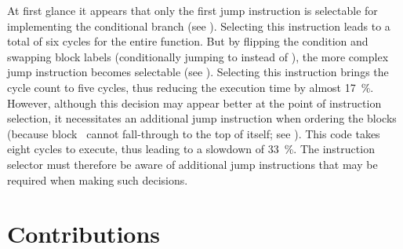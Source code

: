 At first glance it appears that only the first jump \gls{instruction} is
selectable for implementing the conditional branch (see
).
%
Selecting this \gls{instruction} leads to a total of six cycles for the entire
\gls{function}.
%
But by flipping the condition and swapping block labels (conditionally jumping
to  instead of ), the more complex jump
\gls{instruction} becomes selectable (see
).
%
Selecting this \gls{instruction} brings the cycle count to five cycles, thus
reducing the execution time by almost \SI{17}{\percent}.
%
However, although this decision may appear better at the point of
\gls{instruction selection}, it necessitates an additional jump
\gls{instruction} when ordering the \glspl{block} (because block~
cannot fall-through to the top of itself; see
).
%
This code takes eight cycles to execute, thus leading to a slowdown of
\SI{33}{\percent}.
%
The \gls{instruction selector} must therefore be aware of additional jump
\glspl{instruction} that may be required when making such decisions.


\section{Contributions}

